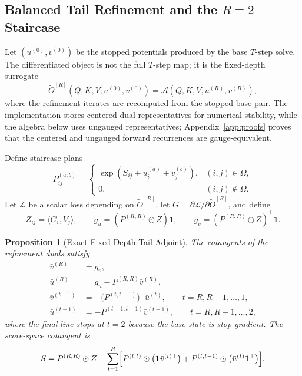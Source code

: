 \documentclass{article}
\newtheorem{proposition}{Proposition}
\begin{document}
\subsection{Balanced Tail Refinement and the \texorpdfstring{$R=2$}{R=2} Staircase}

Let $(u^{(0)},v^{(0)})$ be the stopped potentials produced by the base $T$-step solve. The differentiated object is not the full $T$-step map; it is the fixed-depth surrogate
\[
\widetilde O^{[R]}(Q,K,V;u^{(0)},v^{(0)}) = \mathcal{A}(Q,K,V,u^{(R)},v^{(R)}),
\]
where the refinement iterates are recomputed from the stopped base pair. The implementation stores centered dual representatives for numerical stability, while the algebra below uses ungauged representatives; Appendix~\ref{app:proofs} proves that the centered and ungauged forward recurrences are gauge-equivalent.

Define staircase plans
\[
P_{ij}^{(a,b)} =
\begin{cases}
\exp(S_{ij}+u_i^{(a)}+v_j^{(b)}), & (i,j)\in\Omega, \\
0, & (i,j)\notin\Omega.
\end{cases}
\]
Let $\mathcal{L}$ be a scalar loss depending on $\widetilde O^{[R]}$, let $G=\partial \mathcal{L}/\partial \widetilde O^{[R]}$, and define
\[
Z_{ij}=\langle G_i, V_j\rangle,
\qquad
g_u=(P^{(R,R)}\odot Z)\mathbf{1},
\qquad
g_v=(P^{(R,R)}\odot Z)^\top\mathbf{1}.
\]

\begin{proposition}[Exact Fixed-Depth Tail Adjoint]\label{prop:tail_adjoint_main}
The cotangents of the refinement duals satisfy
\begin{align}
    \bar v^{(R)} &= g_v, \\
    \bar u^{(R)} &= g_u - P^{(R,R)}\bar v^{(R)}, \\
    \bar v^{(t-1)} &= -\bigl(P^{(t,t-1)}\bigr)^\top \bar u^{(t)}, \qquad t=R,R-1,\dots,1, \\
    \bar u^{(t-1)} &= -P^{(t-1,t-1)}\bar v^{(t-1)}, \qquad t=R,R-1,\dots,2,
\end{align}
where the final line stops at $t=2$ because the base state is stop-gradient. The score-space cotangent is
\begin{equation}
\label{eq:generic_score_vjp_unified}
\bar S
=
P^{(R,R)} \odot Z
-
\sum_{t=1}^R
\Bigl[
P^{(t,t)} \odot \bigl(\mathbf{1}\bar v^{(t)\top}\bigr)
+
P^{(t,t-1)} \odot \bigl(\bar u^{(t)}\mathbf{1}^\top\bigr)
\Bigr].
\end{equation}
\end{proposition}
\end{document}
